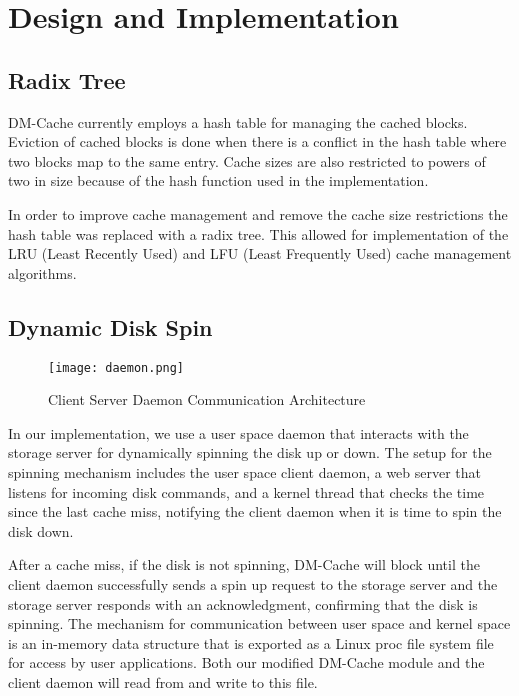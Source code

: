 \section{Design and Implementation}
\label{sec:implementation}

\subsection{Radix Tree}

DM-Cache currently employs a hash table for managing the cached blocks. Eviction
of cached blocks is done when there is a conflict in the hash table where two
blocks map to the same entry. Cache sizes are also restricted to powers of two
in size because of the hash function used in the implementation.

In order to improve cache management and remove the cache size restrictions the
hash table was replaced with a radix tree. This allowed for implementation of
the LRU (Least Recently Used) and LFU (Least Frequently Used) cache management
algorithms.

\subsection{Dynamic Disk Spin}

\begin{figure}[t]
  \caption{Client Server Daemon Communication Architecture}
  \centering \texttt{[image: daemon.png]}
  \label{fig:daemon}
\end{figure}

In our implementation, we use a user space daemon that interacts with the
storage server for dynamically spinning the disk up or down. The setup for the
spinning mechanism includes the user space client daemon, a web server that
listens for incoming disk commands, and a kernel thread that checks the time
since the last cache miss, notifying the client daemon when it is time to spin
the disk down.

After a cache miss, if the disk is not spinning, DM-Cache will block until the
client daemon successfully sends a spin up request to the storage server and the
storage server responds with an acknowledgment, confirming that the disk is
spinning. The mechanism for communication between user space and kernel space is
an in-memory data structure that is exported as a Linux proc file system file
for access by user applications. Both our modified DM-Cache module and the
client daemon will read from and write to this file.
